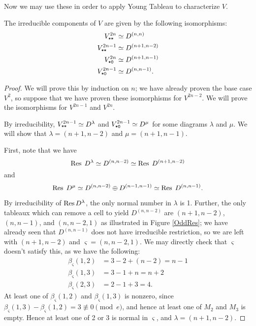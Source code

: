 \documentclass{amsart}
\begin{document}
Now we may use these in order to apply Young Tableau to characterize $V$.
\begin{theorem}\label{Fibonacci Theorem}
  The irreducible components of $V$ are given by the following isomorphisms:
     \begin{align*}  
      V^{2n}_{\texttt{*}\texttt{*}} &\simeq D^{(n,n)}\\ 
      V^{2n-1}_{\texttt{*}\texttt{*}} &\simeq D^{(n+1,n-2)}\\
      V^{2n}_{\texttt{*}\texttt{0}} &\simeq D^{(n+1,n-1)}\\
      V^{2n-1}_{\texttt{*}\texttt{0}} &\simeq D^{(n,n-1)}.
     \end{align*}
\end{theorem}
\begin{proof}
  We will prove this by induction on $n$;
  we have already proven the base case $V^{2}$, so suppose that we have proven these isomorphisms for $V^{2n-2}$.
  We will prove the isomorphisms for $V^{2n-1}$ and $V^{2n}$.

  By irreducibility, $V^{2n-1}_{\texttt{*}\texttt{*}} \simeq D^{\lambda}$ and $V^{2n-1}_{\texttt{*}\texttt{0}} \simeq D^{\mu}$ for some diagrams $\lambda$ and $\mu$.
  We will show that $\lambda = (n+1,n-2)$ and $\mu = (n+1,n-1)$.
  
  First, note that we have \[\operatorname{Res} \; D^{\lambda} \simeq D^{(n,n-2)} \simeq \operatorname{Res} \; D^{(n+1,n-2)}\] and \[\operatorname{Res} \; D^{\mu} \simeq D^{(n,n-2)} \oplus D^{(n-1,n-1)} \simeq \operatorname{Res} \; D^{(n,n-1)}.\]
  
  By irreducibility of $\operatorname{Res} D^{\lambda}$, the only normal number in $\lambda$ is 1.
  Further, the only tableaux which can remove a cell to yield $D^{(n,n-2)}$ are $(n+1,n-2)$, $(n,n-1)$, and $(n,n-2,1)$ as illustrated in Figure \ref{OddRes};
  we have already seen that $D^{(n,n-1)}$ does not have irreducible restriction, so we are left with $(n+1,n-2)$ and $\varsigma = (n,n-2,1)$.
  We may directly check that $\varsigma$ doesn't satisfy this, as we have the following:
  \begin{align*} 
    \beta_\varsigma(1,2) &= 3 - 2 + (n-2) = n-1\\
    \beta_\varsigma(1,3) &= 3 - 1 + n = n+2\\
    \beta_\varsigma(2,3) &= 2 - 1 + 3 = 4.
   \end{align*} 
  At least one of $\beta_\varsigma(1,2)$ and $\beta_\varsigma(1,3)$ is nonzero, since $\beta_\varsigma(1,3) - \beta_\varsigma(1,2) = 3 \not\equiv 0 \pmod e$, and hence at least one of $M_2$ and $M_3$ is empty.
  Hence at least one of 2 or 3 is normal in $\varsigma$, and $\lambda = (n+1,n-2)$.


\end{proof}
\end{document}
